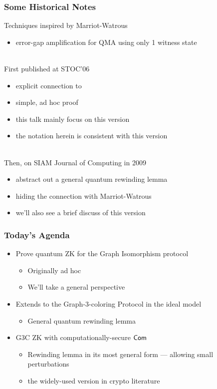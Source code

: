 \documentclass[aspectratio=1610, 12pt, xcolor={dvipsnames}]{beamer}
\begin{document}
\begin{frame}
\frametitle{Some Historical Notes}
Techniques inspired by Marriot-Watrous \cite{DBLP:conf/coco/MarriottW04} 
\begin{itemize}
\item error-gap amplification for QMA using only 1 witness state
\end{itemize}
~\\
First published at STOC'06 \cite{DBLP:conf/stoc/Watrous06}
\begin{itemize}
\item
explicit connection to \cite{DBLP:conf/coco/MarriottW04}
\item
simple, ad hoc proof
\item
this talk mainly focus on this version
\item
the notation herein is consistent with this version
\end{itemize}
~\\
Then, on SIAM Journal of Computing in 2009 \cite{DBLP:journals/siamcomp/Watrous09}
\begin{itemize}
\item
abstract out a general quantum rewinding lemma
\item
hiding the connection with Marriot-Watrous
\item
we'll also see a brief discuss of this version 
\end{itemize}
\end{frame}


\begin{frame}
\frametitle{Today's Agenda}
\begin{itemize}
\item
Prove quantum ZK for the Graph Isomorphism protocol \cite{DBLP:conf/focs/GoldreichMW86} 
\begin{itemize}
\item 
Originally ad hoc \cite{DBLP:conf/stoc/Watrous06}
\item
We'll take a general perspective 
\end{itemize}
\item
Extends to the Graph-3-coloring Protocol \cite{DBLP:conf/focs/GoldreichMW86} in the ideal \Com model 
\begin{itemize}
\item
General quantum rewinding lemma
\end{itemize}
\item
G3C ZK with computationally-secure $\mathsf{Com}$ 
\begin{itemize}
\item
Rewinding lemma in its most general form --- allowing small perturbations
\item
the widely-used version in crypto literature
\end{itemize}
\end{itemize}
\end{frame}
\end{document}

